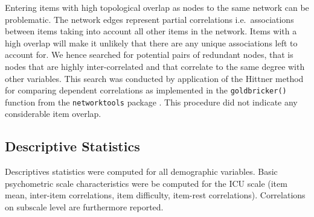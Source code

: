 \documentclass[a4paper,12pt]{article} %
\begin{document}
Entering items with high topological overlap as nodes to the same network can be problematic.
The network edges represent partial correlations i.e.~associations between items taking into account all other items in the network.
Items with a high overlap will make it unlikely that there are any unique associations left to account for.
We hence searched for potential pairs of redundant nodes, that is nodes that are highly inter-correlated and that correlate to the same degree with other variables.  
This search was conducted by application of the Hittner method for comparing dependent correlations \parencite{hittner_monte_2003} as implemented in the \texttt{goldbricker()} function from the \texttt{networktools} package \parencite{networktools}.
This procedure did not indicate any considerable item overlap.





\subsection{Descriptive Statistics}
Descriptives statistics were computed for all demographic variables.
Basic psychometric scale characteristics were be computed for the ICU scale (item mean, inter-item correlations, item difficulty, item-rest correlations).
Correlations on subscale level are furthermore reported.
\end{document}
